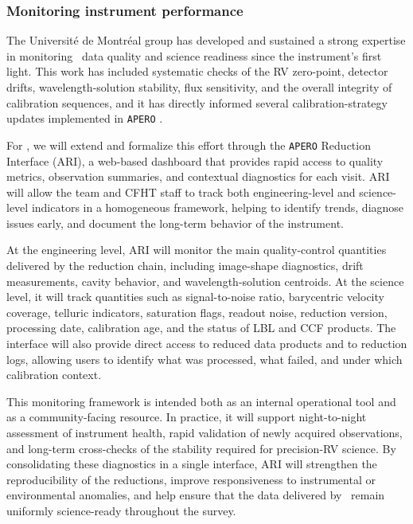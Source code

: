 \subsubsection{Monitoring instrument performance}

The Universit\'e de Montr\'eal group has developed and sustained a strong expertise in monitoring \spi\ data quality and science readiness since the instrument's first light. This work has included systematic checks of the RV zero-point, detector drifts, wavelength-solution stability, flux sensitivity, and the overall integrity of calibration sequences, and it has directly informed several calibration-strategy updates implemented in \texttt{APERO} \citep{cook_apero_2022}.

For \amakihi, we will extend and formalize this effort through the \texttt{APERO} Reduction Interface (ARI), a web-based dashboard that provides rapid access to quality metrics, observation summaries, and contextual diagnostics for each visit. ARI will allow the team and CFHT staff to track both engineering-level and science-level indicators in a homogeneous framework, helping to identify trends, diagnose issues early, and document the long-term behavior of the instrument.

At the engineering level, ARI will monitor the main quality-control quantities delivered by the reduction chain, including image-shape diagnostics, drift measurements, cavity behavior, and wavelength-solution centroids. At the science level, it will track quantities such as signal-to-noise ratio, barycentric velocity coverage, telluric indicators, saturation flags, readout noise, reduction version, processing date, calibration age, and the status of LBL and CCF products. The interface will also provide direct access to reduced data products and to reduction logs, allowing users to identify what was processed, what failed, and under which calibration context.

This monitoring framework is intended both as an internal operational tool and as a community-facing resource. In practice, it will support night-to-night assessment of instrument health, rapid validation of newly acquired observations, and long-term cross-checks of the stability required for precision-RV science. By consolidating these diagnostics in a single interface, ARI will strengthen the reproducibility of the reductions, improve responsiveness to instrumental or environmental anomalies, and help ensure that the data delivered by \wena\ remain uniformly science-ready throughout the survey.
